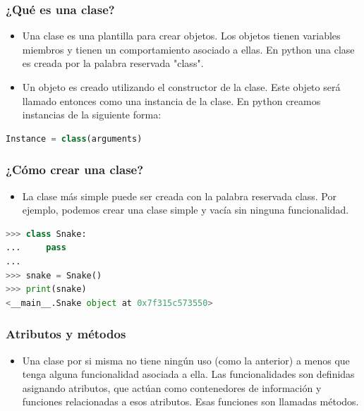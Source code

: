 \documentclass[hyperref={pdfpagelabels=false},xcolor=pst,pdf,fragile]{beamer}
\begin{document}
\begin{frame}[fragile]
    \frametitle{¿Qué es una clase?}
    \pause
    \begin{itemize}
    \item Una clase es una plantilla para crear objetos. Los objetos tienen variables miembros y tienen un comportamiento asociado a ellas. En python una clase es creada por la palabra reservada "class".
    \item Un objeto es creado utilizando el constructor de la clase. Este objeto será llamado entonces como una instancia de la clase. En python creamos instancias de la siguiente forma:
    \end{itemize}
    \begin{lstlisting}[language=python]
    Instance = class(arguments)
    \end{lstlisting}
\end{frame}

\begin{frame}[fragile]
    \frametitle{¿Cómo crear una clase?}
    \pause
    \begin{itemize}
    \item La clase más simple puede ser creada con la palabra reservada class. Por ejemplo, podemos crear una clase simple y vacía sin ninguna funcionalidad.
    \end{itemize}
    \begin{lstlisting}[language=python]
>>> class Snake:
...     pass
... 
>>> snake = Snake()
>>> print(snake)
<__main__.Snake object at 0x7f315c573550>
    \end{lstlisting}
\end{frame}

\begin{frame}
    \frametitle{Atributos y métodos}
    \pause
    \begin{itemize}
    \item Una clase por si misma no tiene ningún uso (como la anterior) a menos que tenga alguna funcionalidad asociada a ella. Las funcionalidades son definidas asignando atributos, que actúan como contenedores de información y funciones relacionadas a esos atributos. Esas funciones son llamadas métodos.
    \end{itemize}
\end{frame}
\end{document}
